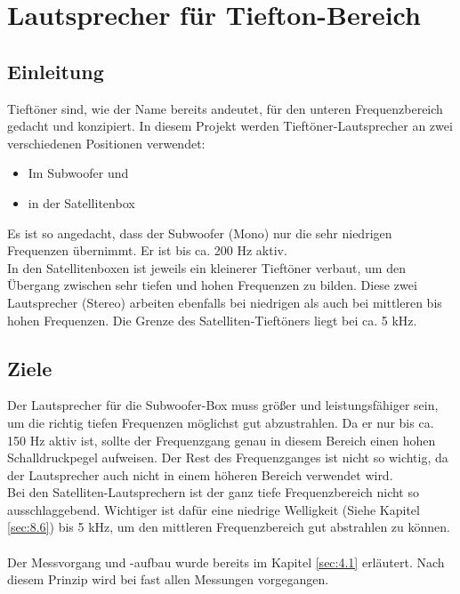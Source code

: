 
\section{Lautsprecher für Tiefton-Bereich} \label{sec:4.2}
\subsection*{Einleitung} \label{subsec:4.2.1}
Tieftöner sind, wie der Name bereits andeutet, für den unteren Frequenzbereich gedacht und konzipiert.
In diesem Projekt werden Tieftöner-Lautsprecher an zwei verschiedenen Positionen verwendet:
\begin{itemize}
	\item Im Subwoofer und 
	\item in der Satellitenbox
\end{itemize}
Es ist so angedacht, dass der Subwoofer (Mono) nur die sehr niedrigen Frequenzen übernimmt.
Er ist bis ca. 200 Hz aktiv.\\
In den Satellitenboxen ist jeweils ein kleinerer Tieftöner verbaut, um den Übergang zwischen sehr tiefen und hohen Frequenzen zu bilden.
Diese zwei Lautsprecher (Stereo) arbeiten ebenfalls bei niedrigen als auch bei mittleren bis hohen Frequenzen.
Die Grenze des Satelliten-Tieftöners liegt bei ca. 5 kHz.

\subsection*{Ziele} \label{subsec:4.2.2}
Der Lautsprecher für die Subwoofer-Box muss größer und leistungsfähiger sein, um die richtig tiefen Frequenzen möglichst gut abzustrahlen.
Da er nur bis ca. 150 Hz aktiv ist, sollte der Frequenzgang genau in diesem Bereich einen hohen Schalldruckpegel aufweisen.
Der Rest des Frequenzganges ist nicht so wichtig, da der Lautsprecher auch nicht in einem höheren Bereich verwendet wird. \\
Bei den Satelliten-Lautsprechern ist der ganz tiefe Frequenzbereich nicht so ausschlaggebend.
Wichtiger ist dafür eine niedrige Welligkeit (Siehe Kapitel \ref{sec:8.6}) bis 5 kHz, um den mittleren Frequenzbereich gut abstrahlen zu können.\\ \\
Der Messvorgang und -aufbau wurde bereits im Kapitel \ref{sec:4.1} erläutert.
Nach diesem Prinzip wird bei fast allen Messungen vorgegangen.

